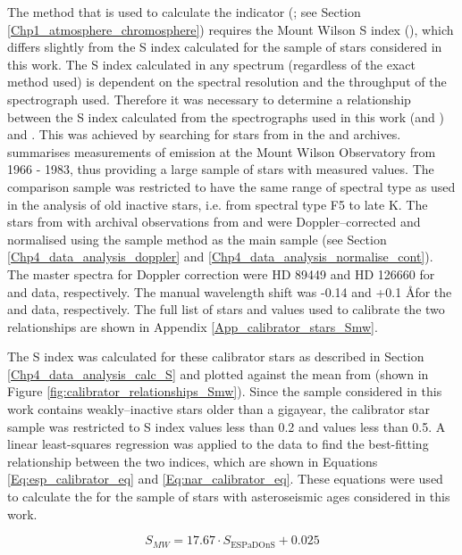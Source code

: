 The method that is used to calculate the \Rprime indicator (\citealt{Noyes_etal_1984}; see Section \ref{Chp1_atmosphere_chromosphere}) requires the Mount Wilson S index (\Smw), which differs slightly from the S index calculated for the sample of stars considered in this work. The S index calculated in any spectrum (regardless of the exact method used) is dependent on the spectral resolution and the throughput of the spectrograph used. Therefore it was necessary to determine a relationship between the S index calculated from the spectrographs used in this work (\esp and \narval) and \Smw. This was achieved by searching for stars from \citet{Duncan_etal_1991} in the \esp and \narval archives. \citet{Duncan_etal_1991} summarises measurements of \caII emission at the Mount Wilson Observatory from 1966 - 1983, thus providing a large sample of stars with measured \Smw values. The comparison sample was restricted to have the same range of spectral type as used in the analysis of old inactive stars, i.e. from spectral type F5 to late K. The stars from \citet{Duncan_etal_1991} with archival observations from \esp and \narval were Doppler--corrected and normalised using the sample method as the main sample (see Section \ref{Chp4_data_analysis_doppler} and \ref{Chp4_data_analysis_normalise_cont}). The master spectra for Doppler correction were HD 89449 and HD 126660 for \esp and \narval data, respectively. The manual wavelength shift was -0.14 and +0.1 \AA \space for the \esp and \narval data, respectively. The full list of stars and values used to calibrate the two relationships are shown in Appendix \ref{App_calibrator_stars_Smw}.

The S index was calculated for these calibrator stars as described in Section \ref{Chp4_data_analysis_calc_S} and plotted against the mean \Smw from \citet{Duncan_etal_1991} (shown in Figure \ref{fig:calibrator_relationships_Smw}). Since the sample considered in this work contains weakly--inactive stars older than a gigayear, the calibrator star sample was restricted to S index values less than 0.2 and \Smw values less than 0.5. A linear least-squares regression was applied to the data to find the best-fitting relationship between the two indices, which are shown in Equations \ref{Eq:esp_calibrator_eq} and \ref{Eq:nar_calibrator_eq}. These equations were used to calculate the \Smw for the sample of stars with asteroseismic ages considered in this work.

\begin{equation}
S_{MW} = 17.67 \cdot S_{\mathrm{ESPaDOnS}}+ 0.025
\label{Eq:esp_calibrator_eq}
\end{equation}

